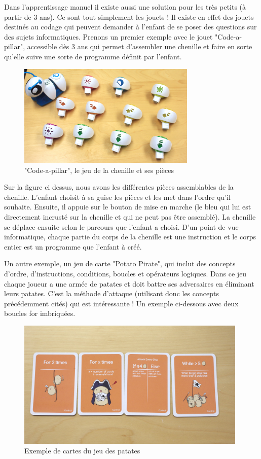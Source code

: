 \newpage

Dans l'apprentissage manuel il existe aussi une solution pour les très petits (à partir de 3 ans). Ce sont tout simplement les jouets ! Il existe en effet des jouets destinés au codage qui peuvent demander à l'enfant de se poser des questions sur des sujets informatiques. \cite{39} Prenons un premier exemple avec le jouet "Code-a-pillar", accessible dès 3 ans qui permet d'assembler une chenille et faire en sorte qu'elle suive une sorte de programme définit par l'enfant.

\begin{figure}[!htb]
  \centering
  \includegraphics[width=85mm,scale=0.5]{images/codeapillar-min.jpg}
  \caption{"Code-a-pillar", le jeu de la chenille et ses pièces}
  \label{fig:boat1}
\end{figure}

Sur la figure ci dessus, nous avons les différentes pièces assemblables de la chenille. L'enfant choisit à sa guise les pièces et les met dans l'ordre qu'il souhaite. Ensuite, il appuie sur le bouton de mise en marche (le bleu qui lui est directement incrusté sur la chenille et qui ne peut pas être assemblé). La chenille se déplace ensuite selon le parcours que l'enfant a choisi. D'un point de vue informatique, chaque partie du corps de la chenille est une instruction et le corps entier est un programme que l'enfant à créé.

Un autre exemple, un jeu de carte "Potato Pirate", qui inclut des concepts d'ordre, d'instructions, conditions, boucles et opérateurs logiques. Dans ce jeu chaque joueur a une armée de patates et doit battre ses adversaires en éliminant leurs patates. C'est la méthode d'attaque (utilisant donc les concepts précédemment cités) qui est intéressante ! Un exemple ci-dessous avec deux boucles for imbriquées.

\begin{figure}[!htb]
  \centering
  \includegraphics[width=110mm,scale=0.5]{images/control_cards-min.jpg}
  \caption{Exemple de cartes du jeu des patates}
  \label{fig:boat1}
\end{figure}

